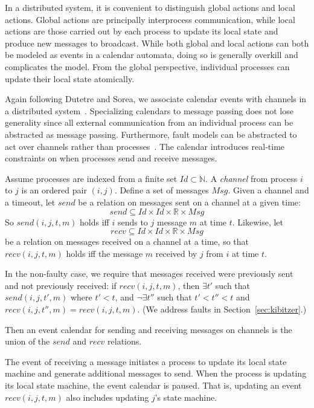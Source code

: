 \documentclass{llncs/llncs}
\newcommand{\lee}[1]{ } %
\newcommand{\lee}[1]{ {\color{blue}$<$lee: #1$>$} } %
\begin{document}
In a distributed system, it is convenient to distinguish global actions and local actions. Global actions are principally interprocess communication, while local actions are those carried out by each process to update its local state and produce new messages to broadcast. While both global and local actions can both be modeled as events in a calendar automata, doing so is generally overkill and complicates the model. From the global perspective, individual processes can update their local state atomically.

Again following Dutetre and Sorea, we associate calendar events with channels in a distributed system~\cite{dutetre}. Specializing calendars to message passing does not lose generality since all external communication from an individual process can be abstracted as message passing. Furthermore, fault models can be abstracted to act over channels rather than processes~\cite{abstractions}. The calendar introduces real-time constraints on when processes send and receive messages.

Assume processes are indexed from a finite set $Id \subset \mathbb{N}$. A \emph{channel} from process $i$ to $j$ is an ordered pair $(i,j)$. Define a set of messages $Msg$. Given a channel and a timeout, let $send$ be a relation on messages sent on a channel at a given time:
$$send \subseteq Id \times Id \times \mathbb{R} \times Msg$$
So $send(i, j, t, m)$ holds iff $i$ sends to $j$ message $m$ at time $t$. Likewise, let
$$recv \subseteq Id \times Id \times \mathbb{R} \times Msg$$
be a relation on messages received on a channel at a time, so that $recv(i, j, t, m)$ holds iff the message $m$ received by $j$ from $i$ at time $t$.

In the non-faulty case, we require that messages received were previously sent and not previously received: if $recv(i, j, t, m)$, then $\exists t'$ such that $send(i, j, t', m)$ where $t' < t$, and $\neg\exists t''$ such that $t' < t'' < t$ and $recv(i, j, t'', m) = recv(i, j, t, m)$. (We address faults in Section~\ref{sec:kibitzer}.)

Then an event calendar for sending and receiving messages on channels is the union of the $send$ and $recv$ relations.

\lee{technically, atomic time is just a convenience.}
The event of receiving a message initiates a process to update its local state machine and generate additional messages to send. When the process is updating its local state machine, the event calendar is paused. That is, updating an event $recv(i, j, t, m)$ also includes updating $j$'s state machine.
\end{document}
